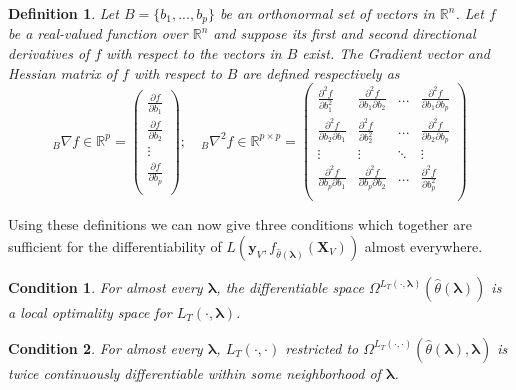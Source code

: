 \documentclass[10pt,letterpaper]{article}
\newtheorem{definition}{Definition}
\newtheorem{condition}{Condition}
\begin{document}
\begin{definition}
Let $B = \{ b_1, ..., b_p \}$ be an orthonormal set of vectors in $\mathbb{R}^n$. Let $f$ be a real-valued function over $\mathbb{R}^n$ and suppose its first and second directional derivatives of $f$ with respect to the vectors in $B$ exist. The Gradient vector and Hessian matrix of $f$ with respect to $B$ are defined respectively as
\begin{equation}\label{eq:hess}
_B\nabla f \in \mathbb{R}^{p} =
\left (
\begin{array}{c}
\frac{\partial f}{\partial b_1} \\
\frac{\partial f}{\partial b_2} \\
\vdots\\
\frac{\partial f}{\partial b_p}\\
\end{array}
\right );
\quad
_B\nabla^2 f \in \mathbb{R}^{p\times p} =
\left (
\begin{array}{cccc}
\frac{\partial^2 f}{\partial b_1^2} & \frac{\partial^2 f}{\partial b_1 \partial b_2} & ...  & \frac{\partial^2 f}{\partial b_1 \partial b_p} \\
\frac{\partial^2 f}{\partial b_2 \partial b_1} & \frac{\partial^2 f}{\partial b_2^2} & ...  & \frac{\partial^2 f}{\partial b_2 \partial b_p} \\
\vdots & \vdots &  \ddots & \vdots \\
\frac{\partial^2 f}{\partial b_p \partial b_1} & \frac{\partial^2 f}{\partial b_p \partial b_2} & ...  & \frac{\partial^2 f}{\partial b_p^2} \\
\end{array}
\right )
\end{equation}
\end{definition}

Using these definitions we can now give three conditions which together are sufficient for the differentiability of $L \left( \boldsymbol{y}_V, f_{\hat{\theta}(\boldsymbol{\lambda})}(\boldsymbol{X}_V) \right )$ almost everywhere.

\begin{condition}
For almost every $\boldsymbol{\lambda}$, the differentiable space $\Omega^{L_T(\cdot, \boldsymbol{\lambda})}(\hat{\theta}\left(\boldsymbol{\lambda}\right))$ is a local optimality space for $L_T\left(\cdot,\boldsymbol{\lambda}\right)$.
\end{condition}

\begin{condition}
For almost every $\boldsymbol{\lambda}$, $L_T\left(\cdot, \cdot\right)$ restricted to $\Omega^{L_T(\cdot, \cdot)}(\hat{\theta}\left(\boldsymbol{\lambda}\right), \boldsymbol{\lambda})$ is twice continuously differentiable within some neighborhood of $\boldsymbol{\lambda}$.
\end{condition}
\end{document}
